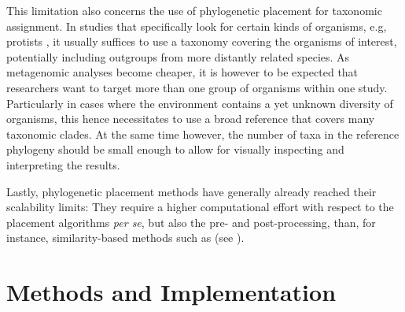 This limitation also concerns the use of phylogenetic placement for taxonomic assignment.
In studies that specifically look for certain kinds of organisms, e.g, protists \citep{Mahe2017},
it usually suffices to use a taxonomy covering the organisms of interest,
potentially including outgroups from more distantly related species.
As metagenomic analyses become cheaper,
it is however to be expected that researchers want to target more than one group of organisms within one study.
Particularly in cases where the environment contains a yet unknown diversity of organisms,
this hence necessitates to use a broad reference that covers many taxonomic clades.
At the same time however, the number of taxa in the reference phylogeny
should be small enough to allow for visually inspecting and interpreting the results.

Lastly, phylogenetic placement methods have generally already reached their scalability limits:
They require a higher computational effort with respect to the placement algorithms \emph{per se},
but also the pre- and post-processing, than, for instance, similarity-based methods such as 
(see ).



\section{Methods and Implementation}
\label{ch:AutomaticTrees:sec:Methods}


